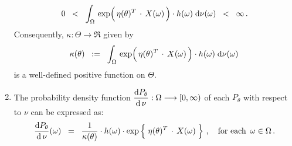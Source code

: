 \begin{definition}
\begin{enumerate}
	\begin{equation*}
	0 \;\; < \;\;
		\int_{\Omega}\,
			\exp\!\left(\,\eta(\theta)^{T} \overset{{\color{white}-}}{\cdot} X(\omega)\,\right) \cdot h(\omega)
		\;\d\nu(\omega)
	\;\; < \;\; \infty\,.
	\end{equation*}
	Consequently, $\kappa : \Theta \longrightarrow \Re$ given by
	\begin{equation*}
	\kappa(\theta)
	\;\; := \;\;
		\int_{\Omega}\,
			\exp\!\left(\,\eta(\theta)^{T} \overset{{\color{white}-}}{\cdot} X(\omega)\,\right) \cdot h(\omega)
		\;\d\nu(\omega)\,
	\end{equation*}
	is a well-defined positive function on $\Theta$.
\item
	The probability density function
	$\dfrac{\textnormal{d} P_{\theta}}{\textnormal{d}\,\nu} : \Omega \longrightarrow [0,\infty)$
	of each $P_{\theta}$ with respect to $\nu$ can be expressed as:
	\begin{equation*}
	\dfrac{\d P_{\theta}}{\d\,\nu}(\omega)
	\;\; = \;\;
		\dfrac{1}{\kappa(\theta)}
		\cdot
		h(\omega)
		\cdot
		\exp\left\{\; \eta(\theta)^{T} \overset{{\color{white}-}}{\cdot} X(\omega) \;\right\}
		\,,
		\quad
		\textnormal{for each \,$\omega\in\Omega$}\,.
	\end{equation*}
\end{enumerate}
\end{definition}


